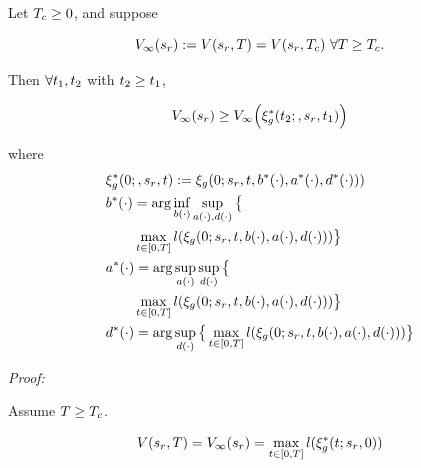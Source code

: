  \begin{claim}
   \label{thm:main}
   Let $T_c \ge 0$, and suppose
   
   \begin{equation}
   \label{eq:conv_valfunc}
   V_\infty(s_r) := V(s_r, T) = V(s_r, T_c) ~ \forall T \ge T_c.
   \end{equation}
   
   Then $\forall t_1, t_2$ with $t_2 \ge t_1$,
   
   \begin{equation}
   \label{eq:invariant}
   V_\infty(s_r) \ge V_\infty\Big(\xi_g^*(t_2;, s_r, t_1)\Big)
   \end{equation}
   
   \noindent where
   \begin{equation}
   \begin{aligned}
   & \xi_g^*(0;, s_r, t) := \xi_g(0; s_r, t, b^*(\cdot), a^*(\cdot), d^*(\cdot))) \\
   & b^*(\cdot) = \arg \inf_{b(\cdot)} \sup_{a(\cdot), d(\cdot)}\big\{ \\
   & \qquad \max_{t \in [0, T]} l(\xi_g(0; s_r, t, b(\cdot), a(\cdot), d(\cdot))) \big\}\\
   & a^*(\cdot) = \arg \sup_{a(\cdot)} \sup_{d(\cdot)} \big\{ \\
   & \qquad \max_{t \in [0, T]} l(\xi_g(0; s_r, t, b(\cdot), a(\cdot), d(\cdot))) \big\} \\
   & d^*(\cdot) = \arg \sup_{d(\cdot)} \big\{\max_{t \in [0, T]} l(\xi_g(0; s_r, t, b(\cdot), a(\cdot),  d(\cdot))) \big\}
   \end{aligned}
   \end{equation}
   
 \end{claim}
 
\textit{Proof:}

Assume $T \ge T_c$.

\begin{equation}
\begin{aligned}
V(s_r, T) &= V_\infty(s_r) = \max_{t \in [0, T]} l(\xi_g^*(t; s_r, 0))\\
\end{aligned}
\end{equation}

